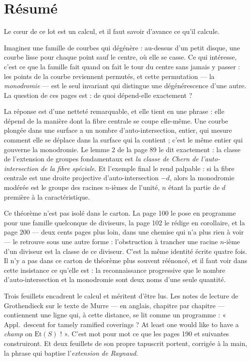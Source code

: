 \documentclass[11pt,a4paper]{article}
\begin{document}
\section*{Résumé}

\begin{resume}
Le cœur de ce lot est un calcul, et il faut savoir d'avance ce qu'il calcule.

Imaginez une famille de courbes qui dégénère : au-dessus d'un petit disque, une
courbe lisse pour chaque point sauf le centre, où elle se casse. Ce qui
intéresse, c'est ce que la famille fait quand on fait le tour du centre sans
jamais y passer : les points de la courbe reviennent permutés, et cette
permutation --- la \emph{monodromie} --- est le seul invariant qui distingue
une dégénérescence d'une autre. La question de ces pages est : de quoi
dépend-elle exactement ?

La réponse est d'une netteté remarquable, et elle tient en une phrase : elle
dépend de la manière dont la fibre centrale se coupe elle-même. Une courbe
plongée dans une surface a un nombre d'auto-intersection, entier, qui mesure
comment elle se déplace dans la surface qui la contient ; c'est le même entier
qui gouverne la monodromie. Le lemme 2 de la page 89 le dit exactement : la
classe de l'extension de groupes fondamentaux est \emph{la classe de Chern de
l'auto-intersection de la fibre spéciale}. Et l'exemple final le rend
palpable : si la fibre centrale est une droite projective d'auto-intersection
$-d$, alors la monodromie modérée est le groupe des racines $n$-ièmes de
l'unité, $n$ étant la partie de $d$ première à la caractéristique.

Ce théorème n'est pas isolé dans le carton. La page 100 le pose en programme
pour une famille quelconque de diviseurs, la page 102 le rédige en corollaire,
et la page 200 --- deux cents pages plus loin, dans une chemise qui n'a plus
rien à voir --- le retrouve sous une autre forme : l'obstruction à trancher une
racine $n$-ième d'un diviseur est la classe de ce diviseur. C'est la même
identité écrite quatre fois. Il n'y a pas dans ce carton de théorème plus
souvent réénoncé, et il faut voir dans cette insistance ce qu'elle est : la
reconnaissance progressive que le nombre d'auto-intersection et la monodromie
sont deux noms d'une seule quantité.

Trois feuillets encadrent le calcul et méritent d'être lus. Les notes de
lecture de Grothendieck sur le texte de Murre --- en anglais, chapitre par
chapitre --- contiennent une ligne qui, à cette distance, se lit comme un
programme : « Appl.\ descent for tamely ramified coverings ? At least one would
like to have a \emph{champ} on $\mathrm{Et}(S)$ ! ». C'est mot pour mot ce que
les pages 190 et suivantes construiront. Et deux feuillets de son propre
tapuscrit portent, corrigée à la main, la phrase qui baptise l'\emph{extension
de Raynaud}.


\end{resume}
\end{document}
